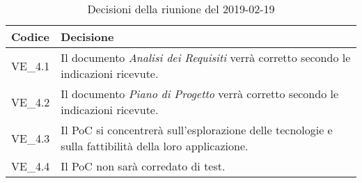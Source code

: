 	\begin{longtable}{ >{\centering}p{} >{}p{}}
		\caption{Decisioni della riunione del 2019-02-19}\\	
		\rowcolorhead
		\textbf{\color{white}Codice} 
		& \centering\textbf{\color{white}Decisione} 
		\tabularnewline 
		\endfirsthead
		VE\_4.1 & Il documento \textit{Analisi dei Requisiti} verrà corretto secondo le indicazioni ricevute.
		
		\tabularnewline 
		VE\_4.2 & Il documento \textit{Piano di Progetto} verrà corretto secondo le indicazioni ricevute.
	
		\tabularnewline 
		VE\_4.3 & Il PoC si concentrerà sull'esplorazione delle tecnologie e sulla fattibilità della loro applicazione.
	
		\tabularnewline 
		VE\_4.4 & Il PoC non sarà corredato di test.

	\end{longtable}

